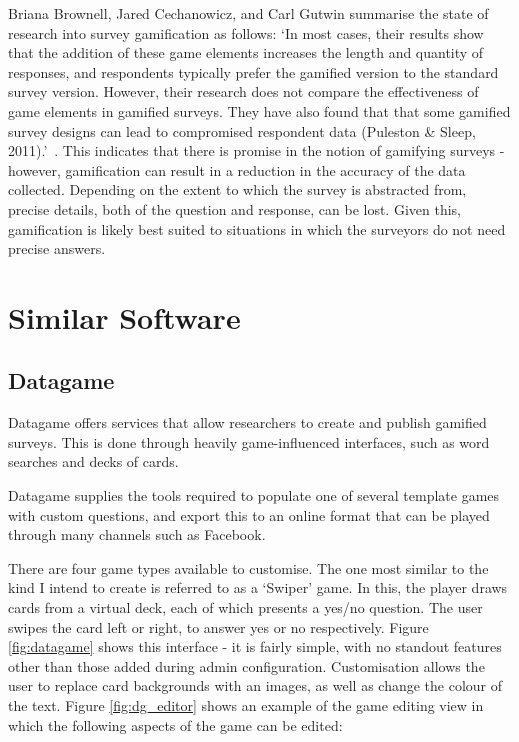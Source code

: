 Briana Brownell, Jared Cechanowicz, and Carl Gutwin summarise the state of research into survey gamification as follows:
`In most cases, their results show that the addition of these game elements increases the length and quantity of responses, and respondents typically prefer the gamified version to the standard survey version. However, their research does not compare the effectiveness of game elements in gamified surveys. They have also found that that some gamified survey designs can lead to compromised respondent data (Puleston \& Sleep, 2011).'~\cite{SurveyGamificationResearch}.
This indicates that there is promise in the notion of gamifying surveys - however, gamification can result in a reduction in the accuracy of the data collected. Depending on the extent to which the survey is abstracted from, precise details, both of the question and response, can be lost. Given this, gamification is likely best suited to situations in which the surveyors do not need precise answers.

\section{Similar Software}

\subsection{Datagame}
Datagame\cite{Datagame} offers services that allow researchers to create and publish gamified surveys. This is done through heavily game-influenced interfaces, such as word searches and decks of cards.

Datagame supplies the tools required to populate one of several template games with custom questions, and export this to an online format that can be played through many channels such as Facebook\cite{Facebook}. 

There are four game types available to customise. The one most similar to the kind I intend to create is referred to as a `Swiper' game. In this, the player draws cards from a virtual deck, each of which presents a yes/no question. The user swipes the card left or right, to answer yes or no respectively. Figure \ref{fig:datagame} shows this interface - it is fairly simple, with no standout features other than those added during admin configuration. Customisation allows the user to replace card backgrounds with an images, as well as change the colour of the text. Figure \ref{fig:dg_editor} shows an example of the game editing view in which the following aspects of the game can be edited:

